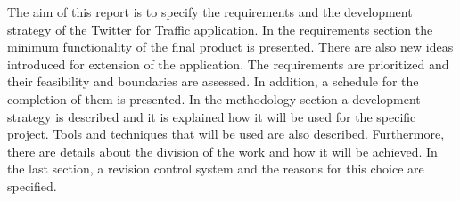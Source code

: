 The aim of this report is to specify the requirements and the development strategy of the Twitter for Traffic application. In the requirements section the minimum functionality of the final product is presented. There are also new ideas introduced for extension of the application. The requirements are prioritized and their feasibility and boundaries are assessed. In addition, a schedule for the completion of them is presented. In the methodology section a development strategy is described and it is explained how it will be used for the specific project. Tools and techniques that will be used are also described. Furthermore, there are details about the division of the work and how it will be achieved. In the last section, a revision control system and the reasons for this choice are specified.
